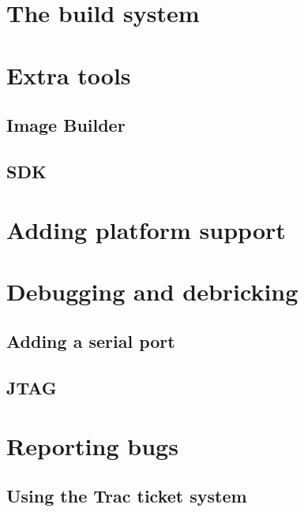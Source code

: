 \documentclass[a4paper]{book}
\begin{document}
  \section{The build system}
    
  \section{Extra tools}
    \subsection{Image Builder}
    \subsection{SDK}
  \section{Adding platform support}
     
  \section{Debugging and debricking}
    \subsection{Adding a serial port}
    \subsection{JTAG}
   \section{Reporting bugs}
	\subsection{Using the Trac ticket system}
	
\end{document}
